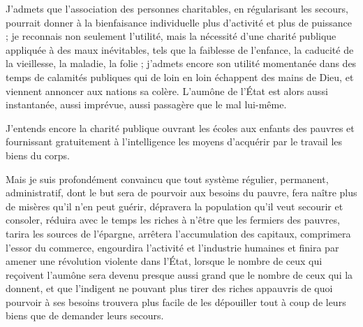 \documentclass[french,twoside]{book} %
\newcommand{\astermono}{\medskip\centerline{\color{rubric}\large\selectfont{\syms ✻}}\medskip\par}%
\begin{document}
J'admets que l’association des personnes charitables, en régularisant les secours, pourrait donner à la bienfaisance individuelle plus d’activité et plus de puissance ; je reconnais non seulement l’utilité, mais la nécessité d’une charité publique appliquée à des maux inévitables, tels que la faiblesse de l’enfance, la caducité de la vieillesse, la maladie, la folie ; j’admets encore son utilité momentanée dans des temps de calamités publiques qui de loin en loin échappent des mains de Dieu, et viennent annoncer aux nations sa colère. L'aumône de l’État est alors aussi instantanée, aussi imprévue, aussi passagère que le mal lui-même.\par
J'entends encore la charité publique ouvrant les écoles aux enfants des pauvres et fournissant gratuitement à l’intelligence les moyens d’acquérir par le travail les biens du corps.\par
\bigbreak
\noindent Mais je suis profondément convaincu que tout système régulier, permanent, administratif, dont le but sera de pourvoir aux besoins du pauvre, fera naître plus de misères qu’il n’en peut guérir, dépravera la population qu’il veut secourir et consoler, réduira avec le temps les riches à n’être que les fermiers des pauvres, tarira les sources de l’épargne, arrêtera l’accumulation des capitaux, comprimera l’essor du commerce, engourdira l’activité et l’industrie humaines et finira par amener une révolution violente dans l’État, lorsque le nombre de ceux qui reçoivent l’aumône sera devenu presque aussi grand que le nombre de ceux qui la donnent, et que l’indigent ne pouvant plus tirer des riches appauvris de quoi pourvoir à ses besoins trouvera plus facile de les dépouiller tout à coup de leurs biens que de demander leurs secours.\par

\astermono
\end{document}
